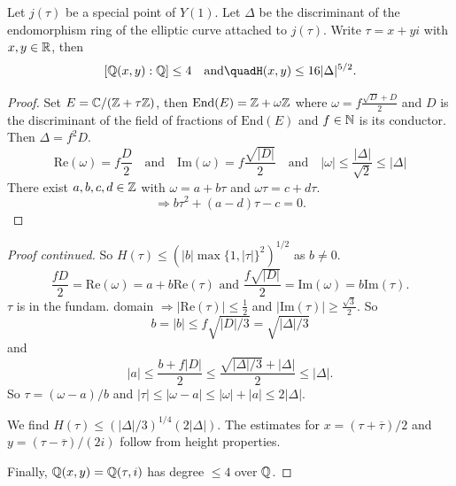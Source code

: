 \documentclass{beamer}
\begin{document}
\begin{frame}
  \begin{lemma}
    Let $j(\tau)$ be a special point of $Y(1)$.
    Let $\Delta$ be the discriminant of
    the endomorphism ring of the elliptic curve attached to $j(\tau)$.
    Write $\tau =x+yi$ with
    $x,y\in{\mathbb{R}}$, then
    $$[\IQ(x,y):\IQ]\le 4\quad\text{and}\quadH(x,y)\le 16|\Delta|^{5/2}.$$
  \end{lemma}
  \begin{proof}\renewcommand{\qedsymbol}{}
    Set $E = {\mathbb{C}}/({\mathbb{Z}}+\tau{\mathbb{Z}})$, then
    $\mathrm{End}(E) = {\mathbb{Z}} + \omega {\mathbb{Z}}$ where $\omega = f
    \frac{\sqrt{D}+D}{2}$ and $D$ is the discriminant of the field of
    fractions of $\mathrm{End}(E)$ and $f\in{\mathbb{N}}$ is its conductor.
    Then $\Delta = f^2D$.
    \begin{equation*}
      \mathrm{Re}(\omega) = f\frac{D}{2} \quad\text{and}\quad
      \mathrm{Im}(\omega) = f\frac{\sqrt{|D|}}{2}
      \quad\text{and}\quad
      |\omega| \le \frac{|\Delta|}{\sqrt{2}}\le|\Delta|
    \end{equation*}
    There exist $a,b,c,d\in{\mathbb{Z}}$ with
    $\omega=a+b\tau$ and $\omega\tau = c+d\tau$.
    \begin{equation*}
      \Rightarrow b\tau^2+(a-d)\tau-c=0.
    \end{equation*}
  \end{proof}
\end{frame}

\begin{frame}
  \begin{proof}[Proof continued]       
    So $H(\tau) \le (|b| \max\{1,|\tau|\}^2)^{1/2}$ as $b\not=0$.
    $$\frac{fD}{2}=\mathrm{Re}(\omega) =
    a+b\mathrm{Re}(\tau)\text{ and }\frac{f\sqrt{|D|}}{2}=\mathrm{Im}(\omega)
    = b \mathrm{Im}(\tau).$$
     $\tau$ is in the fundam. domain $\Rightarrow
     |\mathrm{Re}(\tau)|\le \frac 12$ and $|\mathrm{Im}(\tau)|\ge
    \frac{\sqrt{3}}{2}$. So
    \begin{equation*}
      b=|b|\le {f \sqrt{|D|/3}} = \sqrt{|\Delta|/3}
    \end{equation*}
    and
    \begin{equation*}
    |a|\le \frac{b+f|D|}{2} \le \frac{\sqrt{|\Delta|/3} +
        |\Delta|}{2} \le |\Delta|. 
    \end{equation*}
    So
    $\tau = (\omega-a)/b$ and $|\tau|\le
    |\omega-a|\le|\omega|+|a| \le 2|\Delta| $.

    We find $H(\tau) \le (|\Delta|/3)^{1/4} (2|\Delta|)$.
    The estimates for $x=(\tau+\overline\tau)/2$ and $y=(\tau-\overline\tau)/(2i)$ follow from  height
    properties.

    Finally, ${\mathbb{Q}}(x,y) ={\mathbb{Q}}(\tau,i)$ has degree $\le 4$
    over ${\mathbb{Q}}$. 
  \end{proof}
\end{frame}
\end{document}
